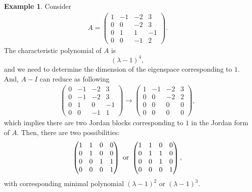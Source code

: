 \documentclass[10pt]{book}
\theoremstyle{definition}
\newtheorem{example}{Example}[chapter]
\numberwithin{equation}{chapter}
\begin{document}
\begin{example}
Consider
\begin{align*}
    A = \begin{pmatrix}
    1 & -1 & -2 & 3 \\
    0 & 0 & -2 & 3 \\
    0 & 1 & 1 & -1 \\
    0 & 0 & -1 & 2
    \end{pmatrix}.
\end{align*}
The characteristic polynomial of $A$ is 
$$(\lambda - 1)^4,$$
and we need to determine the dimension of the eigenspace corresponding to $1$. And, $A - I$ can reduce as following
\begin{align*}
    \begin{pmatrix}
    0 & -1 & -2 & 3 \\
    0 & -1 & -2 & 3 \\
    0 & 1 & 0 & -1 \\
    0 & 0 & -1 & 1
    \end{pmatrix} \to \begin{pmatrix}
    1 & -1 & -2 & 3 \\
    0 & 0 & -2 & 2 \\
    0 & 0 & 0 & 0 \\
    0 & 0 & 0 & 0
    \end{pmatrix},
\end{align*}
which implies there are two Jordan blocks corresponding to $1$ in the Jordan form of $A$. Then, there are two possibilities:
\begin{align*}
    \begin{pmatrix}
    1 & 1 & 0 & 0 \\
    0 & 1 & 0 & 0 \\
    0 & 0 & 1 & 1 \\
    0 & 0 & 0 & 1
    \end{pmatrix}\,\, {\rm or}\,\, \begin{pmatrix}
    1 & 1 & 0 & 0 \\
    0 & 1 & 1 & 0 \\
    0 & 0 & 1 & 0 \\
    0 & 0 & 0 & 1
    \end{pmatrix},
\end{align*}
with corresponding minimal polynomial $(\lambda - 1)^2$ or $(\lambda - 1)^3$.


\end{example}
\end{document}
